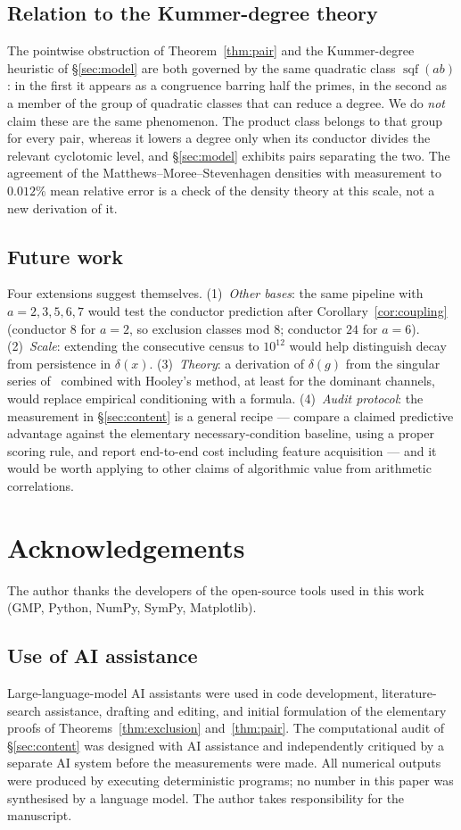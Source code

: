\documentclass[11pt,reqno]{amsart}
\theoremstyle{plain}
\theoremstyle{definition}
\DeclareMathOperator{\sqf}{sqf}
\begin{document}
\subsection*{Relation to the Kummer-degree theory}
The pointwise obstruction of Theorem~\ref{thm:pair} and the Kummer-degree heuristic of
\S\ref{sec:model} are both governed by the same quadratic class $\sqf(ab)$: in the first it
appears as a congruence barring half the primes, in the second as a member of the group of
quadratic classes that can reduce a degree. We do \emph{not} claim these are the same
phenomenon. The product class belongs to that group for every pair, whereas it lowers a
degree only when its conductor divides the relevant cyclotomic level, and
\S\ref{sec:model} exhibits pairs separating the two. The agreement of the
Matthews--Moree--Stevenhagen densities with measurement to $0.012\%$ mean relative error is
a check of the density theory at this scale, not a new derivation of it.

\subsection*{Future work}
Four extensions suggest themselves. (1)~\emph{Other bases}: the same pipeline with
$a=2,3,5,6,7$ would test the conductor prediction after Corollary~\ref{cor:coupling}
(conductor $8$ for $a=2$, so exclusion classes mod $8$; conductor $24$ for $a=6$).
(2)~\emph{Scale}: extending the consecutive census to $10^{12}$ would help distinguish decay
from persistence in $\delta(x)$. (3)~\emph{Theory}: a derivation of $\delta(g)$ from the
singular series of~\cite{HardyLittlewood1923} combined with Hooley's method, at least for
the dominant channels, would replace empirical conditioning with a formula. (4)~\emph{Audit
protocol}: the measurement in \S\ref{sec:content} is a general recipe --- compare a claimed
predictive advantage against the elementary necessary-condition baseline, using a proper
scoring rule, and report end-to-end cost including feature acquisition --- and it would be
worth applying to other claims of algorithmic value from arithmetic correlations.

\section*{Acknowledgements}
The author thanks the developers of the open-source tools used in this work
(GMP, Python, NumPy, SymPy, Matplotlib).

\subsection*{Use of AI assistance}
Large-language-model AI assistants were used in code development, literature-search
assistance, drafting and editing, and initial formulation of the elementary proofs of
Theorems~\ref{thm:exclusion} and~\ref{thm:pair}. The computational audit of
\S\ref{sec:content} was designed with AI assistance and independently critiqued by a
separate AI system before the measurements were made. All numerical outputs were produced by
executing deterministic programs; no number in this paper was synthesised by a language
model. The author takes responsibility for the manuscript.
\end{document}
